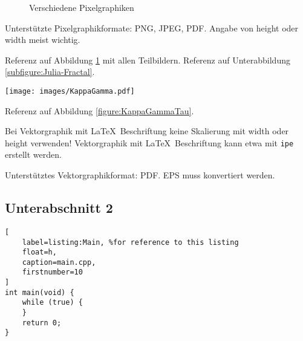 \begin{figure}[!ht]
	\centering
	\qquad
	\caption[
		Verschiedene Pixelgraphiken\newline
		\small\texttt{https://mediacube.at/wiki/}
	]{
		Verschiedene Pixelgraphiken
	}
	\label{figure:PixelImages}
\end{figure}

Unterstützte Pixelgraphikformate: PNG, JPEG, PDF.
Angabe von height oder width meist wichtig.

Referenz auf Abbildung \ref{figure:PixelImages} mit allen Teilbildern.
Referenz auf Unterabbildung \ref{subfigure:Julia-Fractal}.

\begin{figure*}[t]
	\centering
	\texttt{[image: images/KappaGamma.pdf]}
	\caption{
		Vektorgraphik mit \LaTeX\ Beschriftung ($\kappa$, $\gamma$)
	}
	\label{figure:KappaGammaTau}
\end{figure*}

Referenz auf Abbildung \ref{figure:KappaGammaTau}.

Bei Vektorgraphik mit \LaTeX\ Beschriftung keine Skalierung mit width
oder height verwenden!
Vektorgraphik mit \LaTeX\ Beschriftung kann etwa mit \texttt{ipe} erstellt
werden.

Unterstütztes Vektorgraphikformat: PDF. EPS muss konvertiert werden.


\subsection{Unterabschnitt 2}
\label{subsection:Coding}

\begin{lstlisting}[
	label=listing:Main, %for reference to this listing
	float=h,
	caption=main.cpp,
	firstnumber=10
]
int main(void) {
	while (true) {
	}
	return 0;
}
\end{lstlisting}

